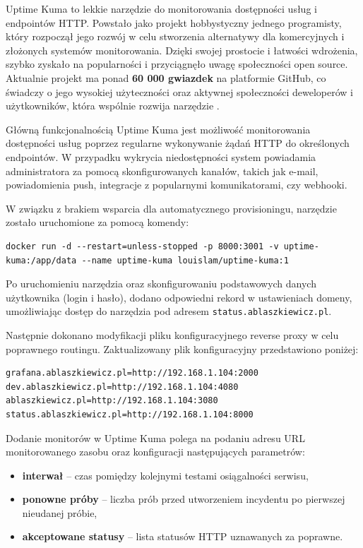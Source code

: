 \documentclass{article}
\begin{document}
Uptime Kuma to lekkie narzędzie do monitorowania dostępności usług i endpointów HTTP. Powstało jako projekt hobbystyczny jednego programisty, który rozpoczął jego rozwój w celu stworzenia alternatywy dla komercyjnych i złożonych systemów monitorowania. Dzięki swojej prostocie i łatwości wdrożenia, szybko zyskało na popularności i przyciągnęło uwagę społeczności open source. Aktualnie projekt ma ponad \textbf{60 000 gwiazdek} na platformie GitHub, co świadczy o jego wysokiej użyteczności oraz aktywnej społeczności deweloperów i użytkowników, która wspólnie rozwija narzędzie \cite{UptimeKumaGithub}.

Główną funkcjonalnością Uptime Kuma jest możliwość monitorowania dostępności usług poprzez regularne wykonywanie żądań HTTP do określonych endpointów. W przypadku wykrycia niedostępności system powiadamia administratora za pomocą skonfigurowanych kanałów, takich jak e-mail, powiadomienia push, integracje z popularnymi komunikatorami, czy webhooki.

W związku z brakiem wsparcia dla automatycznego provisioningu, narzędzie zostało uruchomione za pomocą komendy:

\begin{lstlisting}[caption=Komenda użyta do uruchomienia Uptime Kuma, label=lst:uptime-kuma-run]
docker run -d --restart=unless-stopped -p 8000:3001 -v uptime-kuma:/app/data --name uptime-kuma louislam/uptime-kuma:1
\end{lstlisting}

Po uruchomieniu narzędzia oraz skonfigurowaniu podstawowych danych użytkownika (login i hasło), dodano odpowiedni rekord w ustawieniach domeny, umożliwiając dostęp do narzędzia pod adresem \texttt{status.ablaszkiewicz.pl}. 

Następnie dokonano modyfikacji pliku konfiguracyjnego reverse proxy w celu poprawnego routingu. Zaktualizowany plik konfiguracyjny przedstawiono poniżej:

\begin{lstlisting}[caption=Zmodyfikowany plik konfiguracyjny reverse proxy, label=lst:reverse-proxy-config]
grafana.ablaszkiewicz.pl=http://192.168.1.104:2000
dev.ablaszkiewicz.pl=http://192.168.1.104:4080
ablaszkiewicz.pl=http://192.168.1.104:3080
status.ablaszkiewicz.pl=http://192.168.1.104:8000
\end{lstlisting}

Dodanie monitorów w Uptime Kuma polega na podaniu adresu URL monitorowanego zasobu oraz konfiguracji następujących parametrów:
\begin{itemize}
    \item \textbf{interwał} – czas pomiędzy kolejnymi testami osiągalności serwisu,
    \item \textbf{ponowne próby} – liczba prób przed utworzeniem incydentu po pierwszej nieudanej próbie,
    \item \textbf{akceptowane statusy} – lista statusów HTTP uznawanych za poprawne.
\end{itemize}
\end{document}
